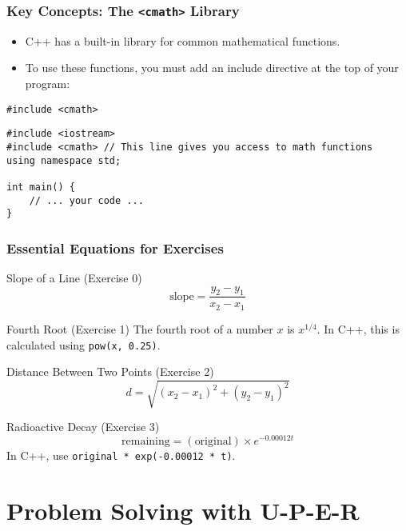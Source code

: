 \documentclass{beamer}
\begin{document}
\begin{frame}[fragile]
\frametitle{Key Concepts: The \texttt{<cmath>} Library}
\begin{itemize}
    \item C++ has a built-in library for common mathematical functions.
    \item To use these functions, you must add an include directive at the top of your program:
\end{itemize}
\begin{block}{\texttt{\#include <cmath>}}
\begin{verbatim}
#include <iostream>
#include <cmath> // This line gives you access to math functions
using namespace std;

int main() {
    // ... your code ...
}
\end{verbatim}
\end{block}
\end{frame}

\begin{frame}
\frametitle{Essential Equations for Exercises}
\begin{block}{Slope of a Line (Exercise 0)}
$$ \text{slope} = \frac{y_2 - y_1}{x_2 - x_1} $$
\end{block}
\pause
\begin{block}{Fourth Root (Exercise 1)}
The fourth root of a number $x$ is $x^{1/4}$. In C++, this is calculated using \texttt{pow(x, 0.25)}.
\end{block}
\pause
\begin{block}{Distance Between Two Points (Exercise 2)}
$$ d = \sqrt{(x_2 - x_1)^2 + (y_2 - y_1)^2} $$
\end{block}
\pause
\begin{block}{Radioactive Decay (Exercise 3)}
$$ \text{remaining} = (\text{original}) \times e^{-0.00012t} $$
In C++, use \texttt{original * exp(-0.00012 * t)}.
\end{block}
\end{frame}

\section{Problem Solving with U-P-E-R}
\end{document}
